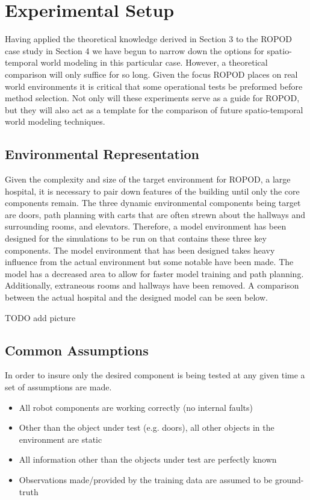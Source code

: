 

  \chapter{Experimental Setup}

  Having applied the theoretical knowledge derived in Section 3 to the ROPOD case
  study in Section 4 we have begun to narrow down the options for spatio-temporal
  world modeling in this particular case. However, a theoretical comparison will
  only suffice for so long. Given the focus ROPOD places on real world
  environments it is critical that some operational tests be preformed before
  method selection. Not only will these experiments serve as a guide for ROPOD,
  but they will also act as a template for the comparison of future
  spatio-temporal world modeling techniques.


  \section{ Environmental Representation}

  Given the complexity and size of the target environment for ROPOD, a large
  hospital, it is necessary to pair down features of the building until only
  the core components remain. The three dynamic environmental components being
  target are doors, path planning with carts that are often strewn about the
  hallways and surrounding rooms, and elevators. Therefore, a model
  environment has been designed for the simulations to be run on that contains
  these three key components.  The model environment that has been designed
  takes heavy influence from the actual environment but some notable have been
  made. The model has a decreased area to allow for faster model training and
  path planning. Additionally, extraneous rooms and hallways have been
  removed. A comparison between the actual hospital and the designed model can
  be seen below.

  TODO add picture


  \section{ Common Assumptions }
  In order to insure only the desired component is being tested at any given
  time a set of assumptions are made.

  \begin{itemize}

    \item All robot components are working correctly (no internal faults)

    \item Other than the object under test (e.g. doors), all other objects in the
          environment are static

    \item All information other than the objects under test are perfectly known

    \item Observations made/provided by the training data are assumed to be
          ground-truth

  \end{itemize}


